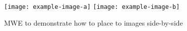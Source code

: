 \documentclass{article}
\begin{document}
\blindtext
\begin{figure}
\texttt{[image: example-image-a]}\hfill
\texttt{[image: example-image-b]}
\caption{MWE to demonstrate how to place to images side-by-side}
\end{figure}
\blindtext
\end{document}

